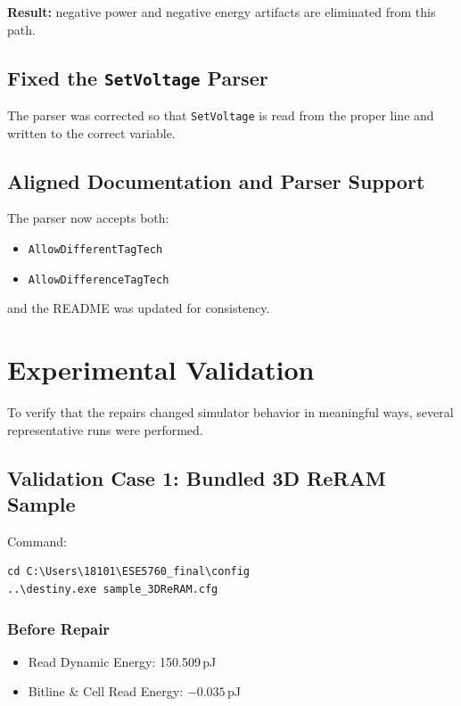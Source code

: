 \documentclass[11pt]{article}
\begin{document}
\textbf{Result:} negative power and negative energy artifacts are eliminated from this path.

\subsection{Fixed the \texttt{SetVoltage} Parser}

The parser was corrected so that \texttt{SetVoltage} is read from the proper line and written to the correct variable.

\subsection{Aligned Documentation and Parser Support}

The parser now accepts both:

\begin{itemize}[leftmargin=1.5em]
    \item \texttt{AllowDifferentTagTech}
    \item \texttt{AllowDifferenceTagTech}
\end{itemize}

and the README was updated for consistency.

\section{Experimental Validation}

To verify that the repairs changed simulator behavior in meaningful ways, several representative runs were performed.

\subsection{Validation Case 1: Bundled 3D ReRAM Sample}

Command:

\begin{verbatim}
cd C:\Users\18101\ESE5760_final\config
..\destiny.exe sample_3DReRAM.cfg
\end{verbatim}

\subsubsection*{Before Repair}

\begin{itemize}[leftmargin=1.5em]
    \item Read Dynamic Energy: 150.509\,pJ
    \item Bitline \& Cell Read Energy: $-0.035$\,pJ
\end{itemize}
\end{document}
